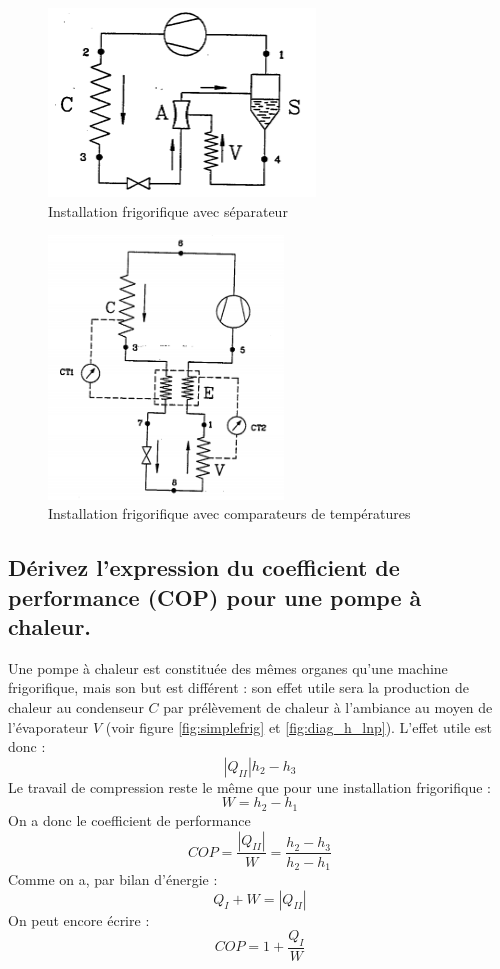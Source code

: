\begin{figure}[p]\centering
	\includegraphics[height=5cm]{figures/grosfrigo}
	\caption{Installation frigorifique avec séparateur}
	\label{fig:grosfrigo}
\end{figure}
\begin{figure}[p]\centering
	\includegraphics[height=7cm]{figures/petitfrigo}
	\caption{Installation frigorifique avec comparateurs de températures}
	\label{fig:petitfrigo}
\end{figure}

\subsection{Dérivez l'expression du coefficient de performance (COP) pour une pompe à chaleur.}
Une pompe à chaleur est constituée des mêmes organes qu'une machine frigorifique, mais son but est différent : son effet utile sera la production de chaleur au condenseur $C$ par prélèvement de chaleur à l'ambiance au moyen de l'évaporateur $V$ (voir figure \ref{fig:simplefrig} et \ref{fig:diag_h_lnp}).
L'effet utile est donc :
\begin{equation} |Q_{II}| h_2-h_3 \end{equation}
Le travail de compression reste le même que pour une installation frigorifique :
\begin{equation} W = h_2-h_1 \end{equation}
On a donc le coefficient de performance 
\begin{equation} COP = \frac{|Q_{II}|}{W} = \frac{h_2-h_3}{h_2-h_1} \end{equation}
Comme on a, par bilan d'énergie :
\begin{equation} Q_I + W = |Q_{II}| \end{equation}
On peut encore écrire :
\begin{equation} COP = 1 + \frac{Q_I}{W} \end{equation}
